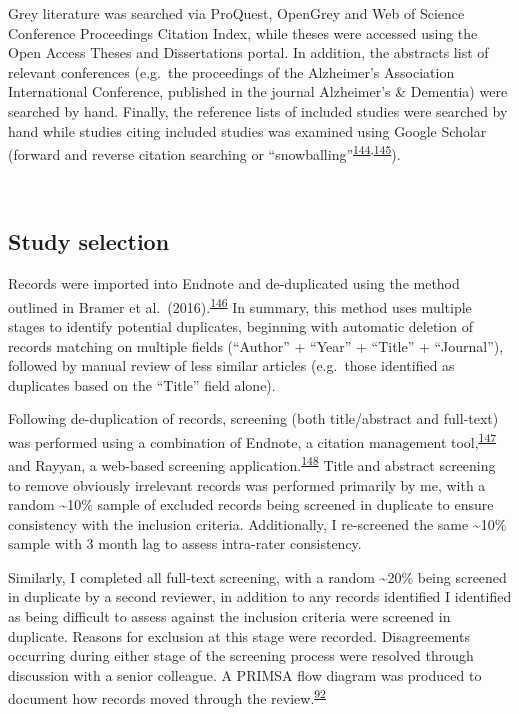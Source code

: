 \documentclass[a4paper, twoside]{templates/ociamthesis}
\begin{document}
Grey literature was searched via ProQuest, OpenGrey and Web of Science Conference Proceedings Citation Index, while theses were accessed using the Open Access Theses and Dissertations portal. In addition, the abstracts list of relevant conferences (e.g.~the proceedings of the Alzheimer's Association International Conference, published in the journal Alzheimer's \& Dementia) were searched by hand. Finally, the reference lists of included studies were searched by hand while studies citing included studies was examined using Google Scholar (forward and reverse citation searching or ``snowballing''\textsuperscript{\protect\hyperlink{ref-greenhalgh2005}{144},\protect\hyperlink{ref-wohlin2014}{145}}).

~

\hypertarget{study-selection}{%
\subsection{Study selection}\label{study-selection}}

Records were imported into Endnote and de-duplicated using the method outlined in Bramer et al.~(2016).\textsuperscript{\protect\hyperlink{ref-bramer2016}{146}} In summary, this method uses multiple stages to identify potential duplicates, beginning with automatic deletion of records matching on multiple fields (``Author'' + ``Year'' + ``Title'' + ``Journal''), followed by manual review of less similar articles (e.g.~those identified as duplicates based on the ``Title'' field alone).

Following de-duplication of records, screening (both title/abstract and full-text) was performed using a combination of Endnote, a citation management tool,\textsuperscript{\protect\hyperlink{ref-hupe2019}{147}} and Rayyan, a web-based screening application.\textsuperscript{\protect\hyperlink{ref-ouzzani2016}{148}} Title and abstract screening to remove obviously irrelevant records was performed primarily by me, with a random \textasciitilde10\% sample of excluded records being screened in duplicate to ensure consistency with the inclusion criteria. Additionally, I re-screened the same \textasciitilde10\% sample with 3 month lag to assess intra-rater consistency.

Similarly, I completed all full-text screening, with a random \textasciitilde20\% being screened in duplicate by a second reviewer, in addition to any records identified I identified as being difficult to assess against the inclusion criteria were screened in duplicate. Reasons for exclusion at this stage were recorded. Disagreements occurring during either stage of the screening process were resolved through discussion with a senior colleague. A PRIMSA flow diagram was produced to document how records moved through the review.\textsuperscript{\protect\hyperlink{ref-page2021}{92}}
\end{document}
